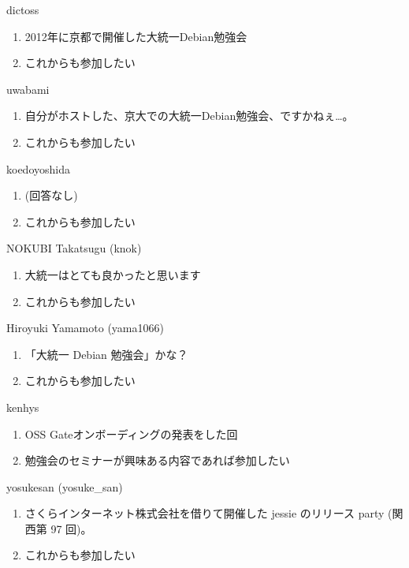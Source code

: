 \begin{prework}{ dictoss }
  \begin{enumerate}
  \item 2012年に京都で開催した大統一Debian勉強会
  \item これからも参加したい
  \end{enumerate}
\end{prework}

\begin{prework}{ uwabami }
  \begin{enumerate}
  \item 自分がホストした、京大での大統一Debian勉強会、ですかねぇ…。
  \item これからも参加したい
  \end{enumerate}
\end{prework}

\begin{prework}{ koedoyoshida }
  \begin{enumerate}
  \item (回答なし)
  \item これからも参加したい
  \end{enumerate}
\end{prework}

\begin{prework}{ NOKUBI Takatsugu (knok) }
  \begin{enumerate}
  \item 大統一はとても良かったと思います
  \item これからも参加したい
  \end{enumerate}
\end{prework}

\begin{prework}{ Hiroyuki Yamamoto (yama1066) }
  \begin{enumerate}
  \item 「大統一 Debian 勉強会」かな？
  \item これからも参加したい
  \end{enumerate}
\end{prework}

\begin{prework}{ kenhys }
  \begin{enumerate}
  \item OSS Gateオンボーディングの発表をした回
  \item 勉強会のセミナーが興味ある内容であれば参加したい
  \end{enumerate}
\end{prework}

\begin{prework}{ yosukesan (yosuke\_san) }
  \begin{enumerate}
  \item さくらインターネット株式会社を借りて開催した jessie のリリース party (関西第 97 回)。
  \item これからも参加したい
  \end{enumerate}
\end{prework}
